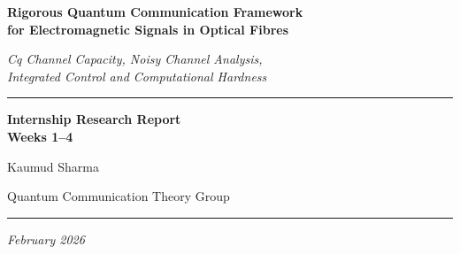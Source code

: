 \documentclass[12pt,a4paper]{article}
\theoremstyle{definition}
\theoremstyle{plain}
\begin{document}
\begin{titlepage}
\centering
\vspace*{1.5cm}

{\LARGE\bfseries Rigorous Quantum Communication Framework\\[0.4em]
for Electromagnetic Signals in Optical Fibres}

\vspace{0.6em}
{\large\itshape Cq Channel Capacity, Noisy Channel Analysis,\\
Integrated Control and Computational Hardness}

\vspace{1.2cm}
\rule{0.6\linewidth}{0.8pt}

\vspace{0.8cm}
{\large\bfseries Internship Research Report\\[0.3em] Weeks 1--4}

\vspace{0.8cm}
{\large Kaumud Sharma}

\vspace{0.4cm}
{\normalsize Quantum Communication Theory Group}

\vspace{1.5cm}
\rule{0.6\linewidth}{0.4pt}

\vspace{1cm}
\begin{abstract}
\setlength{\parindent}{0pt}
\noindent
This report presents a comprehensive, mathematically rigorous quantum communication
framework developed over four weeks of internship research. The framework integrates
five interlocking layers of analysis for electromagnetic signal propagation through optical
fibres: (1)~Maxwell's equations in inhomogeneous media with modal decomposition and
quantum field quantisation; (2)~Classical-Quantum (Cq) channel theory and Holevo
capacity optimisation; (3)~rigorous GKSL noise modelling with exact solution methods
and Quantum Data Processing Inequality; (4)~integrated quantum control during channel
evolution for genuine capacity enhancement; and (5)~quantum channel estimation theory
via the Quantum Cram\'er--Rao Bound. Throughout, we establish the fundamental
computational intractability of optimal signal decoding by proving the NP-hardness of
the Semigroup Julia Inversion Problem (SJIP) through polynomial-time reduction from
\textsc{Subset-Sum}. Week~4 completes the framework with formal security guarantees,
showing that the combined effect of SJIP hardness and channel non-injectivity produces
a dual-layer cryptographic protection. Explicit parameter dependencies are derived for
engineering applications, and testable experimental predictions are provided.
\end{abstract}

\vfill
{\small\itshape February 2026}
\end{titlepage}
\end{document}
